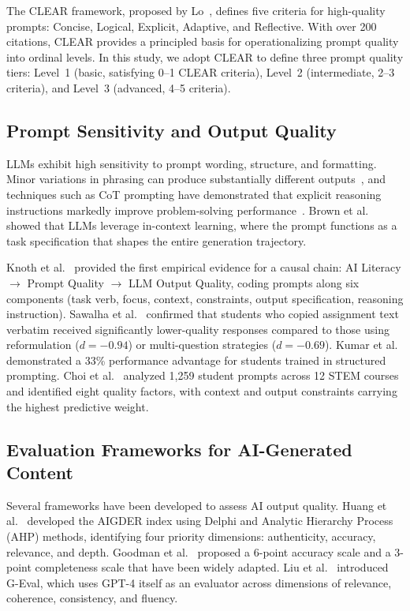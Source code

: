\documentclass[runningheads]{llncs}
\begin{document}
The CLEAR framework, proposed by Lo~\cite{Lo2023}, defines five criteria for high-quality prompts: Concise, Logical, Explicit, Adaptive, and Reflective. With over 200 citations, CLEAR provides a principled basis for operationalizing prompt quality into ordinal levels. In this study, we adopt CLEAR to define three prompt quality tiers: Level~1 (basic, satisfying 0--1 CLEAR criteria), Level~2 (intermediate, 2--3 criteria), and Level~3 (advanced, 4--5 criteria).

\subsection{Prompt Sensitivity and Output Quality}

LLMs exhibit high sensitivity to prompt wording, structure, and formatting. Minor variations in phrasing can produce substantially different outputs~\cite{Zhao2021}, and techniques such as CoT prompting have demonstrated that explicit reasoning instructions markedly improve problem-solving performance~\cite{Wei2022}. Brown et al.~\cite{Brown2020} showed that LLMs leverage in-context learning, where the prompt functions as a task specification that shapes the entire generation trajectory.

Knoth et al.~\cite{Knoth2024} provided the first empirical evidence for a causal chain: AI Literacy $\rightarrow$ Prompt Quality $\rightarrow$ LLM Output Quality, coding prompts along six components (task verb, focus, context, constraints, output specification, reasoning instruction). Sawalha et al.~\cite{Sawalha2024} confirmed that students who copied assignment text verbatim received significantly lower-quality responses compared to those using reformulation ($d = -0.94$) or multi-question strategies ($d = -0.69$). Kumar et al.~\cite{Kumar2025} demonstrated a 33\% performance advantage for students trained in structured prompting. Choi et al.~\cite{Choi2025} analyzed 1{,}259 student prompts across 12 STEM courses and identified eight quality factors, with context and output constraints carrying the highest predictive weight.

\subsection{Evaluation Frameworks for AI-Generated Content}

Several frameworks have been developed to assess AI output quality. Huang et al.~\cite{Huang2025} developed the AIGDER index using Delphi and Analytic Hierarchy Process (AHP) methods, identifying four priority dimensions: authenticity, accuracy, relevance, and depth. Goodman et al.~\cite{Goodman2023} proposed a 6-point accuracy scale and a 3-point completeness scale that have been widely adapted. Liu et al.~\cite{Liu2023} introduced G-Eval, which uses GPT-4 itself as an evaluator across dimensions of relevance, coherence, consistency, and fluency.
\end{document}
